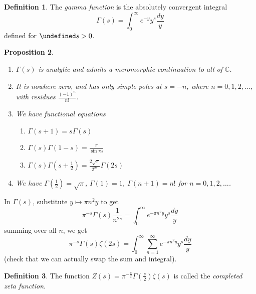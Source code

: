\documentclass[11pt]{article}
\theoremstyle{definition}
\newtheorem{definition}{Definition}[section]
\theoremstyle{plain}
\newtheorem{proposition}[definition]{Proposition}
\theoremstyle{remark}
\let\Re\undefined
\DeclareMathOperator{\Re}{Re}
\newcommand{\CC}{\mathbb{C}}
\begin{document}
\begin{definition}\label{def:5_8}
    The \emph{gamma function} is the absolutely convergent integral
    \begin{equation*}
        \Gamma(s) = \int_0^\infty e^{-y} y^s \frac{dy}{y}
    \end{equation*}
    defined for $\Re s > 0$.
\end{definition}

\begin{proposition}\label{prop:5_9}\phantom{}
    \begin{enumerate}
        \item $\Gamma(s)$ is analytic and admits a meromorphic continuation to all of $\CC$.

        \item It is nowhere zero, and has only simple poles at $s = -n$, where $n=0, 1, 2, \ldots$, with residues $\frac{(-1)^n}{n!}$.

        \item We have functional equations
            \begin{enumerate}
                \item $\Gamma(s+1) = s \Gamma(s)$
                \item $\Gamma(s) \Gamma(1-s) = \frac{\pi}{\sin \pi s}$
                \item $\Gamma(s) \Gamma(s+\frac{1}{2}) = \frac{2 \sqrt{\pi}}{2^{2s}} \Gamma(2 s)$
            \end{enumerate}
        \item We have $\Gamma(\frac{1}{2}) = \sqrt{\pi}$, $\Gamma(1) = 1$, $\Gamma(n+1) = n!$ for $n=0,1,2,\ldots$.
    \end{enumerate}
\end{proposition}

\noindent In $\Gamma(s)$, substitute $y \mapsto \pi n^2 y$ to get
\begin{equation*}
    \pi^{-s} \Gamma(s) \frac{1}{n^{2s}} = \int_0^\infty e^{-\pi n^2 y} y^s \frac{dy}{y}
\end{equation*}
summing over all $n$, we get
\begin{equation*}
    \pi^{-s} \Gamma(s) \zeta(2s) = \int_0^\infty \sum_{n=1}^\infty e^{-\pi n^2 y} y^s \frac{dy}{y}
\end{equation*}
(check that we can actually swap the sum and integral).

\begin{definition}\label{def:5_10}
    The function $Z(s) = \pi^{-\frac{s}{2}} \Gamma(\frac{s}{2}) \zeta(s)$ is called the \emph{completed zeta function}.
\end{definition}
\end{document}
